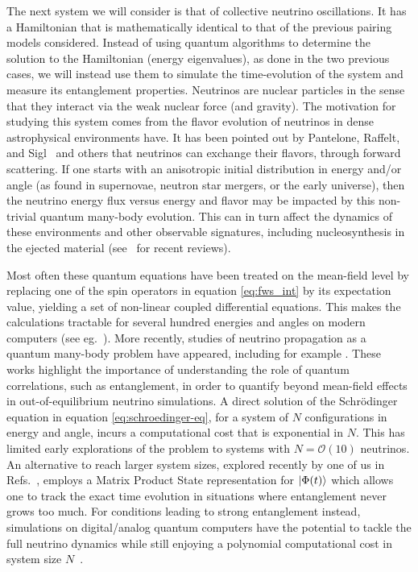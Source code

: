 \documentclass[10pt]{article}
\begin{document}
The next system we will consider is that of collective neutrino oscillations. It has a Hamiltonian that is mathematically identical to that of the previous pairing models considered. Instead of using quantum algorithms to determine the solution to the Hamiltonian (energy eigenvalues), as done in the two previous cases, we will instead use them to simulate the time-evolution of the system and measure its entanglement properties. Neutrinos are nuclear particles in the sense that they interact via the weak nuclear force (and gravity). The motivation for studying this system comes from the flavor evolution of neutrinos in dense astrophysical environments have. It has been pointed out by Pantelone, Raffelt, and Sigl~\cite{Pantaleone:1992eq,Sigl:1993} and others that neutrinos can exchange their flavors, through forward scattering. If one starts with an anisotropic initial distribution in energy and/or angle (as found in supernovae, neutron star mergers, or the early universe), then the neutrino energy flux versus energy and flavor may be impacted by this non-trivial quantum many-body evolution. This can in turn affect the dynamics of these environments and other observable signatures, including nucleosynthesis in the ejected material (see~\cite{Duan:2010bg,Chakraborty2016b} for recent reviews).

Most often these quantum equations have been treated on the mean-field level by replacing one of the spin operators in equation \eqref{eq:fws_int} by its expectation value, yielding a set of non-linear coupled differential equations. This makes the calculations tractable for several hundred energies and angles on modern computers (see eg.~\cite{Duan:2006}).
More recently, studies of neutrino propagation as a quantum many-body problem have appeared,
including for example \cite{Bell2003,Friedland2003,sawyer2004classical,Pehlivan2011,Rrapaj2020,Cervia:2019,Roggero2021a,Roggero2021b}. These works highlight the importance of understanding the role of quantum correlations, such as entanglement, in order to quantify beyond mean-field effects in out-of-equilibrium neutrino simulations. A direct solution of the Schr\"{o}dinger equation in equation \eqref{eq:schroedinger-eq}, for a system of $N$ configurations in energy and angle, incurs a computational cost that is exponential in $N$. This has limited early explorations of the problem to systems with $N=\mathcal{O}(10)$ neutrinos. An alternative to reach larger system sizes, explored recently by one of us in Refs.~\cite{Roggero2021a,Roggero2021b}, employs a Matrix Product State representation for $\ket{\Phi(t)}$ which allows one to track the exact time evolution in situations where entanglement never grows too much. For conditions leading to strong entanglement instead, simulations on digital/analog quantum computers have the potential to tackle the full neutrino dynamics while still enjoying a polynomial computational cost in system size $N$~\cite{Lloyd96}.
\end{document}
